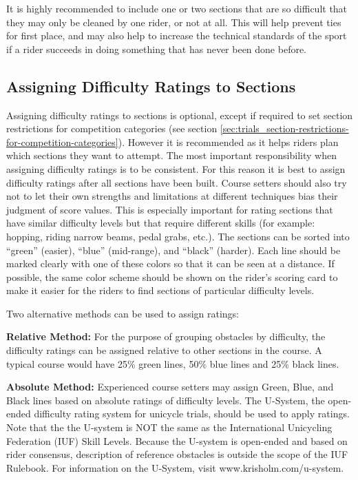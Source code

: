 It is highly recommended to include one or two sections that are so difficult that they may only be cleaned by one rider, or not at all. 
This will help prevent ties for first place, and may also help to increase the technical standards of the sport if a rider succeeds in doing something that has never been done before.

\subsection{Assigning Difficulty Ratings to Sections \label{subsec:trials_guidelines-for-course-setters_assigning-difficulty-ratings}}
Assigning difficulty ratings to sections is optional, except if required to set section restrictions for competition categories (see section \ref{sec:trials_section-restrictions-for-competition-categories}).
However it is recommended as it helps riders plan which sections they want to attempt. 
The most important responsibility when assigning difficulty ratings is to be consistent.
For this reason it is best to assign difficulty ratings after all sections have been built.
Course setters should also try not to let their own strengths and limitations at different techniques bias their judgment of score values.
This is especially important for rating sections that have similar difficulty levels but that require different skills (for example: hopping, riding narrow beams, pedal grabs, etc.). 
The sections can be sorted into ``green'' (easier), ``blue'' (mid-range), and ``black'' (harder).
Each line should be marked clearly with one of these colors so that it can be seen at a distance.
If possible, the same color scheme should be shown on the rider's scoring card to make it easier for the riders to find sections of particular difficulty levels.

Two alternative methods can be used to assign ratings:

\textbf{Relative Method:}
For the purpose of grouping obstacles by difficulty, the difficulty ratings can be assigned relative to other sections in the course. A typical course would have 25\% green lines, 50\% blue lines and 25\% black lines.

\textbf{Absolute Method:}
Experienced course setters may assign Green, Blue, and Black lines based on absolute ratings of difficulty levels.
The U-System, the open-ended difficulty rating system for unicycle trials, should be used to apply ratings.
Note that the the U-system is NOT the same as the International Unicycling Federation (IUF) Skill Levels.
Because the U-system is open-ended and based on rider consensus, description of reference obstacles is outside the scope of the IUF Rulebook.
For information on the U-System, visit www.krisholm.com/u-system.

